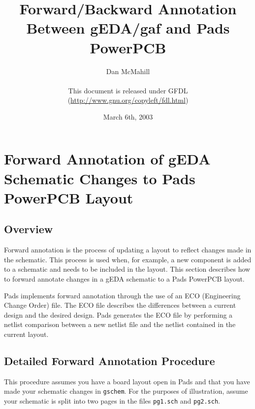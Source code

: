 \documentclass{article}
\title{Forward/Backward Annotation Between gEDA/gaf and Pads PowerPCB}
\author{Dan McMahill\\
        \\
        This document is released under GFDL\\ 
	(\url{http://www.gnu.org/copyleft/fdl.html})}
\date{March 6th, 2003}
\begin{document}
\maketitle
\newpage

\tableofcontents
\newpage

\section{Forward Annotation of gEDA Schematic Changes to Pads PowerPCB Layout}
\subsection{Overview}
Forward annotation is the process of updating a layout to reflect
changes made in the schematic.  This process is used when, for
example, a new component is added to a schematic and needs to be
included in the layout.  This section describes how to forward
annotate changes in a gEDA schematic to a Pads PowerPCB layout.

Pads implements forward annotation through the use of an ECO
(Engineering Change Order) file.  The ECO file describes the
differences between a current design and the desired design.  Pads
generates the ECO file by performing a netlist comparison between a
new netlist file and the netlist contained in the current layout.

\subsection{Detailed Forward Annotation Procedure}
This procedure assumes you have a board layout open in Pads and that
you have made your schematic changes in {\tt gschem}.  For the
purposes of illustration, assume your schematic is split into two
pages in the files {\tt pg1.sch} and {\tt pg2.sch}.
\end{document}
